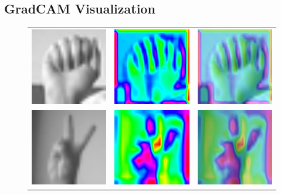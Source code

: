 \documentclass[a4paper]{article}
\begin{document}
\subsection{GradCAM Visualization}
\label{sec:gradcam}
\begin{figure}[t]
     \centering
     \begin{tabular}{ccc}
          \includegraphics[width=.25\linewidth]{graphics/gradcam/layer1/0_original}&\includegraphics[width=.25\linewidth]{graphics/gradcam/layer1/0_map}&\includegraphics[width=.25\linewidth]{graphics/gradcam/layer1/0_overlaid} \\
          \includegraphics[width=.25\linewidth]{graphics/gradcam/layer3/0_original}&\includegraphics[width=.25\linewidth]{graphics/gradcam/layer3/0_map}&\includegraphics[width=.25\linewidth]{graphics/gradcam/layer3/0_overlaid} \\

\end{tabular}
\end{figure}
\end{document}
